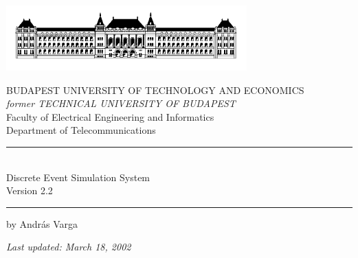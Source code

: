 
\begin{center}
\includegraphics[width=3.648in, height=0.990in]{figures/usmanFig1}
\end{center}


\begin{center}
  {\Large BUDAPEST UNIVERSITY OF TECHNOLOGY AND ECONOMICS }\\
  \vspace{1em}
  \textit{former TECHNICAL UNIVERSITY OF BUDAPEST}\\
  \vspace{1em}
  {\Large Faculty of Electrical Engineering and Informatics}\\
  \vspace{1em}
  {\Large Department of Telecommunications}\\
\end{center}

\vspace{3em}
\hrule
\vspace{2em}
\begin{center}
\tbf{{\huge {\opp}}}\\
\vspace{1.5em}
{\LARGE Discrete Event Simulation System}\\
\vspace{1em}
{\large Version 2.2}\\
\vspace{1em}
\end{center}
\vspace{2em}
\hrule

\vspace{4em}
by {\large Andr\'{a}s Varga}
\vspace{3em}

\textit{Last updated: March 18, 2002}




